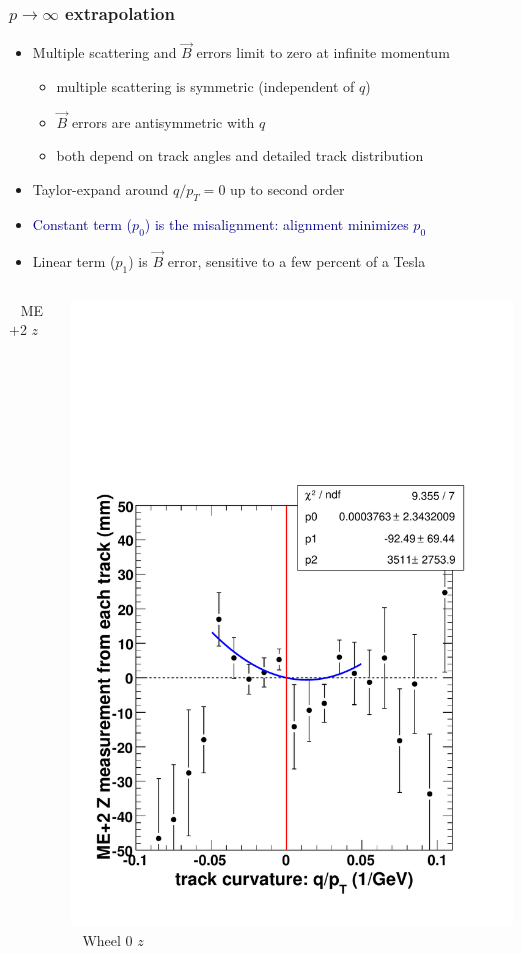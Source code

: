 \documentclass[compress]{beamer}
\begin{document}
\begin{frame}
\frametitle{$p \to \infty$ extrapolation}

\begin{itemize}
\item Multiple scattering and $\vec{B}$ errors limit to zero at infinite momentum
\begin{itemize}
\item multiple scattering is symmetric (independent of $q$)
\item $\vec{B}$ errors are antisymmetric with $q$
\item both depend on track angles and detailed track distribution
\end{itemize}

\item Taylor-expand around $q/p_T = 0$ up to second order
\item \textcolor{darkblue}{Constant term ($p_0$) is the misalignment: alignment minimizes $p_0$}
\item Linear term ($p_1$) is $\vec{B}$ error, sensitive to a few percent of a Tesla
\end{itemize}

\begin{columns}
\mbox{ } \hfill ME$+$2 $z$ \hfill \mbox{ }

\vspace{0.1 cm}
\includegraphics[width=\linewidth]{extrapolation_to_infinite_momentum.pdf}
\mbox{ } \hfill Wheel 0 $z$ \hfill \mbox{ }


\end{columns}
\end{frame}
\end{document}
